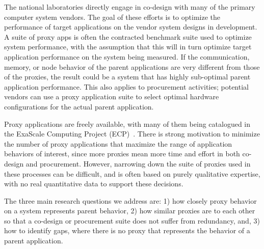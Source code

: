 The national laboratories directly engage in co-design with many of the primary computer system vendors. The goal of these efforts is to optimize the performance of target applications on the vendor system designs in development.
%
A suite of proxy apps is often the contracted benchmark suite used to optimize system performance, with the assumption that this will in turn optimize target application performance on the system being measured.
%
If the communication, memory, or node behavior of the parent applications are very different from those of the proxies, the result could be a system that has highly sub-optimal parent application performance. This also applies to procurement activities; potential vendors can use a proxy application suite to select optimal hardware configurations for the actual parent application.%
 

Proxy applications are freely available, with many of them being catalogued in the ExaScale Computing Project (ECP)~\cite{ECPProxySuite1}.  There is strong motivation to minimize the number of proxy applications that maximize the range of application behaviors of interest, since more proxies mean more time and effort in both co-design and procurement. However, narrowing down the suite of proxies used in these processes can be difficult, and is often based on purely qualitative expertise, with no real quantitative data to support these decisions. 

The three main research questions we address are: 1) how closely proxy behavior on a system represents parent behavior, 2) how similar proxies are to each other so that a co-design or procurement suite does not suffer from redundancy, and, 3) how to identify gaps, where there is no proxy that represents the behavior of a parent application.

